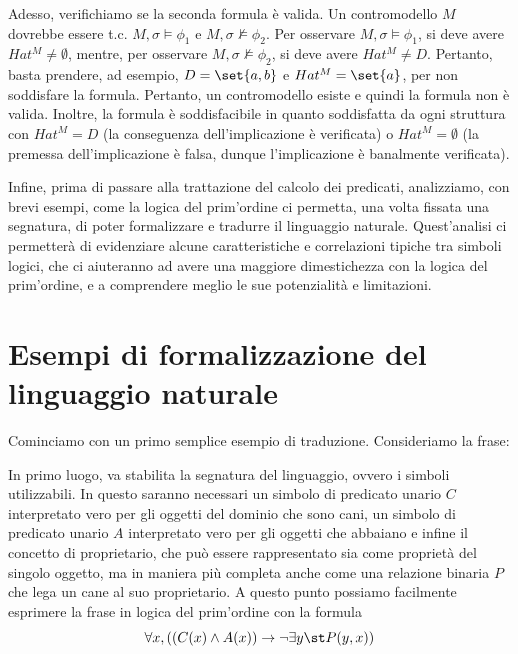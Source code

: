 Adesso, verifichiamo se la seconda formula è valida.
Un contromodello \(M\) dovrebbe essere t.c. \(M,\sigma \models \phi_1\) e \(M,\sigma \not\models \phi_2\).
Per osservare \(M,\sigma \models \phi_1\), si deve avere \(Hat^M \neq \emptyset\), mentre, per osservare \(M,\sigma \not\models \phi_2\), si deve avere \(Hat^M \neq D\).
Pertanto, basta prendere, ad esempio, \(D=\set{a, b}\) e \(Hat^M=\set{a}\), per non soddisfare la formula. Pertanto, un contromodello esiste e quindi la formula non è valida.
Inoltre, la formula è soddisfacibile in quanto soddisfatta da ogni struttura con \(Hat^M=D\) (la conseguenza dell'implicazione è verificata)  o \(Hat^M=\emptyset\) (la premessa dell'implicazione è falsa, dunque l'implicazione è banalmente verificata).

Infine, prima di passare alla trattazione del calcolo dei predicati, analizziamo, con brevi esempi, come la logica del prim'ordine ci permetta, una volta fissata una segnatura, di poter formalizzare e tradurre il linguaggio naturale. Quest'analisi ci permetterà di evidenziare alcune caratteristiche e correlazioni tipiche tra simboli logici, che ci aiuteranno ad avere una maggiore dimestichezza con la logica del prim'ordine, e a comprendere meglio le sue potenzialità e limitazioni.

\section{Esempi di formalizzazione del linguaggio naturale}

Cominciamo con un primo semplice esempio di traduzione. Consideriamo la frase:

\begin{quote}
\end{quote}

In primo luogo, va stabilita la segnatura del linguaggio, ovvero i simboli utilizzabili. In questo saranno necessari un simbolo di predicato unario \(C\) interpretato vero per gli oggetti del dominio che sono cani, un simbolo di predicato unario \(A\) interpretato vero per gli oggetti che abbaiano e infine il concetto di proprietario, che può essere rappresentato sia come proprietà del singolo oggetto, ma in maniera più completa anche come una relazione binaria \(P\) che lega un cane al suo proprietario.
A questo punto possiamo facilmente esprimere la frase in logica del prim'ordine con la formula
\[\forall x, ((C(x) \land A(x)) \to \neg\exists y\st P(y,x))\]


